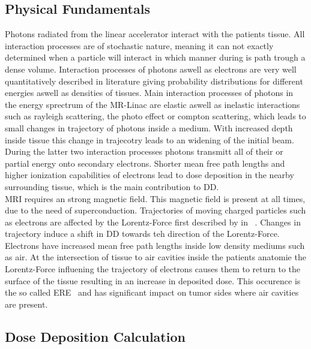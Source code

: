 \subsection{Physical Fundamentals}

Photons radiated from the linear accelerator interact with the patients tissue.
All interaction processes are of stochastic nature, meaning it can not exactly determined when a particle will interact in which manner during is path trough a dense volume.
Interaction processes of photons aswell as electrons are very well quantitatively described in literature giving probability distributions for different energies aswell as densities of tissues.
Main interaction processes of photons in the energy sprectrum of the MR-Linac are elastic aswell as inelastic interactions such as rayleigh scattering, the photo effect or compton scattering, which leads to small changes in trajectory of photons inside a medium.
With increased depth inside tissue this change in trajecotry leads to an widening of the initial beam.
During the latter two interaction processes photons transmitt all of their or partial energy onto secondary electrons.
Shorter mean free path lengths and higher ionization capabilities of electrons lead to dose deposition in the nearby surrounding tissue, which is the main contribution to \acs{DD}.\\
\ac{MRI} requires an strong magnetic field. 
This magnetic field is present at all times, due to the need of superconduction. 
Trajectories of moving charged particles such as electrons are affected by the Lorentz-Force first described by \citeauthor{lorentz_versuch_1937} in \citeyear{lorentz_versuch_1937}~\cite{lorentz_versuch_1937}.
Changes in trajectory induce a shift in \acs{DD} towards teh direction of the Lorentz-Force.
Electrons have increased mean free path lengths inside low density mediums such as air.
At the intersection of tissue to air cavities inside the patients anatomie the Lorentz-Force influening the trajectory of electrons causes them to return to the surface of the tissue resulting in an increase in deposited dose.
This occurence is the so called \ac{ERE}~\cite{lee_using_2017} and has significant impact on tumor sides where air cavities are present.


\subsection{Dose Deposition Calculation}

